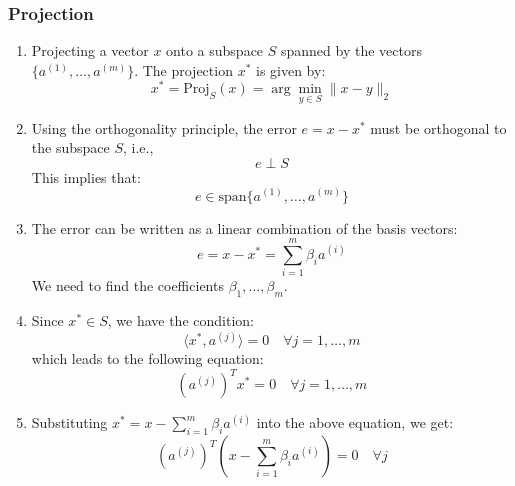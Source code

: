     \subsubsection{Projection}
    \begin{derivation}
        \begin{enumerate}
            \item Projecting a vector $x$ onto a subspace $S$ spanned by the vectors $\{a^{(1)}, \dots, a^{(m)}\}$. 
            The projection $x^*$ is given by:
            \[
            x^* = \text{Proj}_S(x) = \arg \min_{y \in S} \| x - y \|_2
            \]

            \item Using the orthogonality principle, the error $e = x - x^*$ must be orthogonal to the subspace $S$, i.e.,
            \[
            e \perp S
            \]
            This implies that:
            \[
            e \in \text{span}\{a^{(1)}, \dots, a^{(m)}\}
            \]
            
            \item The error can be written as a linear combination of the basis vectors:
            \[
            e = x - x^* = \sum_{i=1}^{m} \beta_i a^{(i)}
            \]
            We need to find the coefficients $\beta_1, \dots, \beta_m$.
            
            \item Since $x^* \in S$, we have the condition:
            \[
            \langle x^*, a^{(j)} \rangle = 0 \quad \forall j = 1, \dots, m
            \]
            which leads to the following equation:
            \[
            (a^{(j)})^T x^* = 0 \quad \forall j = 1, \dots, m
            \]
            
            \item Substituting $x^* = x - \sum_{i=1}^{m} \beta_i a^{(i)}$ into the above equation, we get:
            \[
            (a^{(j)})^T \left( x - \sum_{i=1}^{m} \beta_i a^{(i)} \right) = 0 \quad \forall j
            \]
            

\end{enumerate}
\end{derivation}
